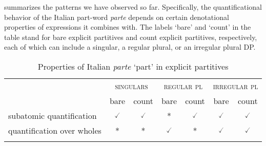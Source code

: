  summarizes the patterns we have observed so far. Specifically, the quantificational behavior of the Italian part-word \textit{parte} depends on certain denotational properties of expressions it combines with. The labels `bare' and `count' in the table stand for bare explicit partitives and count explicit partitives, respectively, each of which can include a singular, a regular plural, or an irregular plural DP.

    \begin{table}[h]
    \centering
\begin{tabular}{lcccccc}
\lsptoprule
                           & \multicolumn{2}{c}{\textsc{singulars}}          & \multicolumn{2}{c}{\textsc{regular pl}}    & \multicolumn{2}{c}{\textsc{irregular pl}}  \\
                           & bare & count & bare & count & bare & count \\ \midrule
subatomic quantification   & $\checked$                   & $\checked$                    & *                              & $\checked$                    & $\checked$                   & $\checked$                    \\
quantification over wholes & *                              & *                               & $\checked$                   & *                               & $\checked$                   & $\checked$                    \\ \lspbottomrule
\end{tabular}
\caption{Properties of Italian \textit{parte} `part' in explicit partitives}
\label{tab:properties-of-italian-parte}
\end{table}

